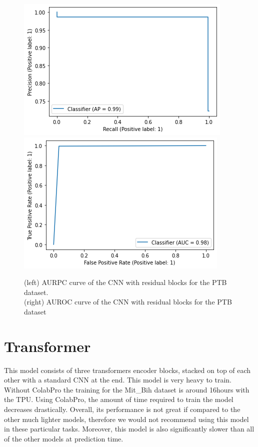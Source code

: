 \documentclass[11pt]{scrartcl}
\begin{document}
\begin{figure}[htp]
\centering
\includegraphics[width=.50\textwidth]{../models_performance_graphs/ptb/res_net_ptb_auprc.png}\hfill
\includegraphics[width=.50\textwidth]{../models_performance_graphs/ptb/res_net_ptb_auroc.png}\hfill
\caption{(left) AURPC curve of the CNN with residual blocks for the PTB dataset. \\ (right) AUROC curve of the CNN with residual blocks for the PTB dataset}
\label{fig:res_ptb_two}
\end{figure}




\section{Transformer}
This model consists of three transformers encoder blocks, stacked on top of each other with a standard CNN at the end. This model is very heavy to train. Without ColabPro the training for the Mit\_Bih dataset is around 16hours with the TPU.  Using ColabPro, the amount of time required to train the model decreases drastically. Overall, its performance is not great if compared to the other much lighter models, therefore we would not recommend using this model in these particular tasks. Moreover, this model is also significantly slower than all of the other models at prediction time.
\end{document}
